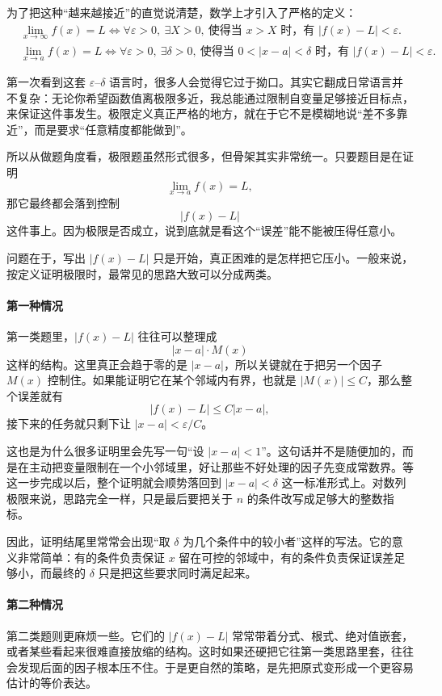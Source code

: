 \documentclass[UTF8]{ctexbook}
\begin{document}
为了把这种“越来越接近”的直觉说清楚，数学上才引入了严格的定义：
\[
\begin{aligned}
&\lim_{x\to\infty} f(x)=L \Longleftrightarrow \forall \varepsilon>0,\ \exists X>0,\ \text{使得当 } x>X \text{ 时，有 } |f(x)-L|<\varepsilon.\\
&\lim_{x\to a} f(x)=L \Longleftrightarrow \forall \varepsilon>0,\ \exists \delta>0,\ \text{使得当 } 0<|x-a|<\delta \text{ 时，有 } |f(x)-L|<\varepsilon.
\end{aligned}
\]

第一次看到这套 $\varepsilon$--$\delta$ 语言时，很多人会觉得它过于拗口。其实它翻成日常语言并不复杂：无论你希望函数值离极限多近，我总能通过限制自变量足够接近目标点，来保证这件事发生。极限定义真正严格的地方，就在于它不是模糊地说“差不多靠近”，而是要求“任意精度都能做到”。

所以从做题角度看，极限题虽然形式很多，但骨架其实非常统一。只要题目是在证明
\[
\lim_{x\to a}f(x)=L,
\]
那它最终都会落到控制
\[
|f(x)-L|
\]
这件事上。因为极限是否成立，说到底就是看这个“误差”能不能被压得任意小。

问题在于，写出 $|f(x)-L|$ 只是开始，真正困难的是怎样把它压小。一般来说，按定义证明极限时，最常见的思路大致可以分成两类。

\paragraph{第一种情况}
第一类题里，$|f(x)-L|$ 往往可以整理成
\[
|x-a|\cdot M(x)
\]
这样的结构。这里真正会趋于零的是 $|x-a|$，所以关键就在于把另一个因子 $M(x)$ 控制住。如果能证明它在某个邻域内有界，也就是 $|M(x)|\le C$，那么整个误差就有
\[
|f(x)-L|\le C|x-a|,
\]
接下来的任务就只剩下让 $|x-a|<\varepsilon/C$。

这也是为什么很多证明里会先写一句“设 $|x-a|<1$”。这句话并不是随便加的，而是在主动把变量限制在一个小邻域里，好让那些不好处理的因子先变成常数界。等这一步完成以后，整个证明就会顺势落回到 $|x-a|<\delta$ 这一标准形式上。对数列极限来说，思路完全一样，只是最后要把关于 $n$ 的条件改写成足够大的整数指标。

因此，证明结尾里常常会出现“取 $\delta$ 为几个条件中的较小者”这样的写法。它的意义非常简单：有的条件负责保证 $x$ 留在可控的邻域中，有的条件负责保证误差足够小，而最终的 $\delta$ 只是把这些要求同时满足起来。

\paragraph{第二种情况}
第二类题则更麻烦一些。它们的 $|f(x)-L|$ 常常带着分式、根式、绝对值嵌套，或者某些看起来很难直接放缩的结构。这时如果还硬把它往第一类思路里套，往往会发现后面的因子根本压不住。于是更自然的策略，是先把原式变形成一个更容易估计的等价表达。
\end{document}
